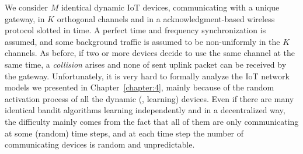 
We consider $M$ identical dynamic IoT devices, communicating with a unique gateway, in $K$ orthogonal channels and in a acknowledgment-based wireless protocol slotted in time.
A perfect time and frequency synchronization is assumed,
and some \iid{} background traffic is assumed to be non-uniformly in the $K$ channels.
As before, if two or more devices decide to use the same channel at the same time, a \emph{collision} arises and none of sent uplink packet can be received by the gateway.
%
Unfortunately, it is very hard to formally analyze the IoT network models we presented in Chapter~\ref{chapter:4}, mainly because of the random activation process of all the dynamic (\ie, learning) devices.
Even if there are many identical bandit algorithms learning independently and in a decentralized way, the difficulty mainly comes from the fact that all of them are only communicating at some (random) time steps, and at each time step the number of communicating devices is random and unpredictable.


